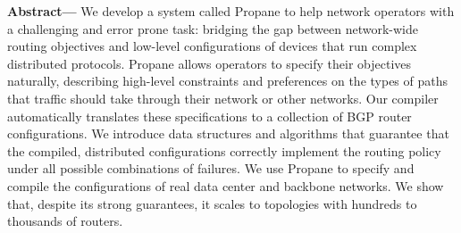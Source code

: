 \documentclass[10pt]{sigalternate052015}
\newcommand{\sysname}{{\small \sf Propane}\xspace}
\begin{document}

\textbf{Abstract---}
We develop a system called \sysname to help network operators with a challenging and error prone task: bridging the gap between network-wide routing objectives and low-level configurations of devices that run complex distributed protocols.
%
\sysname allows operators to specify their objectives naturally, describing high-level constraints and preferences on the types of paths that traffic should take through their network or other networks.
%
Our compiler automatically translates these specifications to a collection of BGP router configurations.
%
We introduce data structures and algorithms that guarantee that the compiled, distributed configurations correctly implement the routing policy under all possible combinations of failures.
%
We use \sysname to specify and compile the configurations of real
data center and backbone networks.  We show that, despite its strong guarantees, it scales to topologies with hundreds to thousands of routers.
\end{document}
